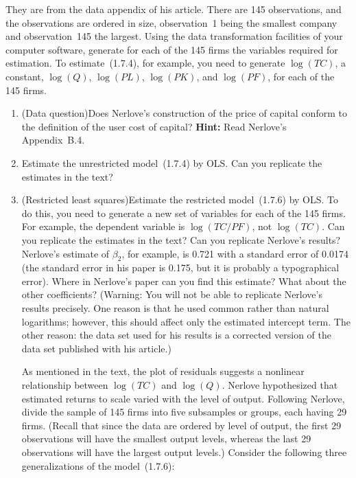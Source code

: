 \begin{problemset}
\noindent
They are from the data appendix of his article. There are 145 observations,
and the observations are ordered in size, observation~1 being the smallest
company and observation~145 the largest. Using the data transformation
facilities of your computer software, generate for each of the 145 firms
the variables required for estimation. To estimate~(1.7.4), for example,
you need to generate $\log(TC)$, a constant, $\log(Q)$, $\log(PL)$,
$\log(PK)$, and $\log(PF)$, for each of the 145 firms.

\begin{enumerate}[label=(\alph*)]
\item (Data question)\quad Does Nerlove's construction of the price of
capital conform to the definition of the user cost of capital?
\textbf{Hint:} Read Nerlove's Appendix~B.4.

\item Estimate the unrestricted model~(1.7.4) by OLS\@. Can you replicate
the estimates in the text?

\item (Restricted least squares)\quad Estimate the restricted
model~(1.7.6) by OLS\@. To do this, you need to generate a new set of
variables for each of the 145 firms. For example, the dependent variable
is $\log(TC/PF)$, not $\log(TC)$. Can you replicate the estimates in the
text? Can you replicate Nerlove's results? Nerlove's estimate of
$\beta_2$, for example, is 0.721 with a standard error of 0.0174 (the
standard error in his paper is 0.175, but it is probably a typographical
error). Where in Nerlove's paper can you find this estimate? What about the
other coefficients? (Warning: You will not be able to replicate Nerlove's
results precisely. One reason is that he used common rather than natural
logarithms; however, this should affect only the estimated intercept term.
The other reason: the data set used for his results is a corrected version
of the data set published with his article.)

As mentioned in the text, the plot of residuals suggests a nonlinear
relationship between $\log(TC)$ and $\log(Q)$. Nerlove hypothesized that
estimated returns to scale varied with the level of output. Following
Nerlove, divide the sample of 145 firms into five subsamples or groups,
each having 29 firms. (Recall that since the data are ordered by level of
output, the first 29 observations will have the smallest output levels,
whereas the last 29 observations will have the largest output levels.)
Consider the following three generalizations of the model~(1.7.6):


\end{enumerate}
\end{problemset}
